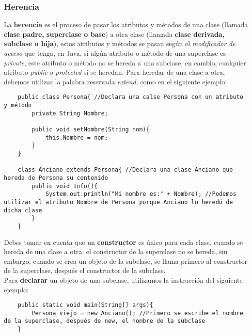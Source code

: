 \subsubsection{Herencia}
La \textbf{herencia} es el proceso de pasar los atributos y métodos de una clase (llamada \textbf{clase padre, superclase o base}) a otra clase (llamada \textbf{clase derivada, subclase o hija}), estos atributos y métodos se pasan según el \textit{modificador de acceso} que tenga, en Java, si algún atributo o método de una superclase es \textit{private}, este atributo o método no se hereda a una subclase. en cambio, cualquier atributo \textit{public} o \textit{protected} si se heredan. Para heredar de una clase a otra, debemos utilizar la palabra reservada \textit{extend}, como en el siguiente ejemplo:
\begin{lstlisting}
    public class Persona{ //Declara una calse Persona con un atributo y método
        private String Nombre;
        
        public void setNombre(String nom){
            this.Nombre = nom;
        }
    }
    
    class Anciano extends Persona{ //Declara una clase Anciano que hereda de Persona su contenido
        public void Info(){
            System.out.println("Mi nombre es:" + Nombre); //Podemos utilizar el atributo Nombre de Persona porque Anciano lo heredó de dicha clase
        }
    }
\end{lstlisting}
Debes tomar en cuenta que un \textbf{constructor} es único para cada clase, cuando se hereda de una clase a otra, el constructor de la superclase no se hereda, sin embargo, cuando se crea un objeto de la subclase, se llama primero al constructor de la superclase, después el constructor de la subclase.\\
Para \textbf{declarar} un objeto de una subclase, utilizamos la instrucción del siguiente ejemplo:
\begin{lstlisting}
    public static void main(String[] args){
        Persona viejo = new Anciano(); //Primero se escribe el nombre de la superclase, después de new, el nombre de la subclase
    }
\end{lstlisting}

